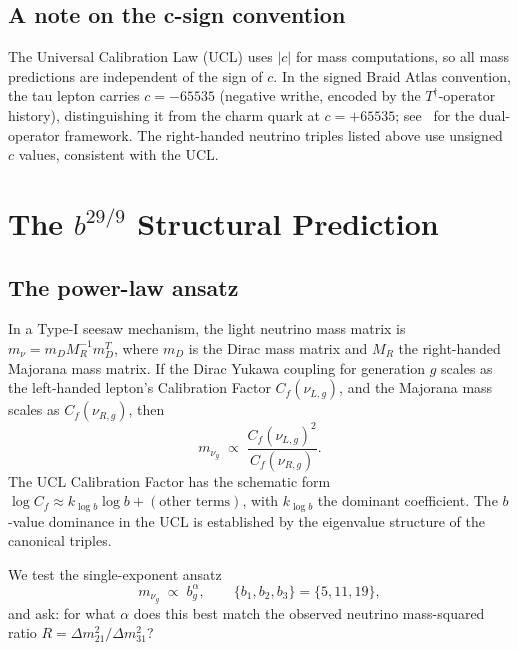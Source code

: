 \documentclass[12pt,a4paper]{article}
\theoremstyle{definition}
\theoremstyle{remark}
\begin{document}
\subsection{A note on the c-sign convention}
\label{subsec:csign}

The Universal Calibration Law (UCL) uses $|c|$ for mass computations,
so all mass predictions are independent of the sign of $c$.
In the signed Braid Atlas convention, the tau lepton carries
$c = -65535$ (negative writhe, encoded by the $T^\dagger$-operator history),
distinguishing it from the charm quark at $c = +65535$;
see~\cite{SpivackBraidAtlas} for the dual-operator framework.
The right-handed neutrino triples listed above use unsigned $c$ values,
consistent with the UCL.

\section{The $b^{29/9}$ Structural Prediction}
\label{sec:prediction}

\subsection{The power-law ansatz}
\label{subsec:ansatz}

In a Type-I seesaw mechanism, the light neutrino mass matrix is
$m_\nu = m_D M_R^{-1} m_D^T$,
where $m_D$ is the Dirac mass matrix and $M_R$ the right-handed
Majorana mass matrix.
If the Dirac Yukawa coupling for generation $g$ scales as the
left-handed lepton's Calibration Factor $C_f(\nu_{L,g})$, and
the Majorana mass scales as $C_f(\nu_{R,g})$, then
\begin{equation}
  m_{\nu_g} \;\propto\; \frac{C_f(\nu_{L,g})^2}{C_f(\nu_{R,g})}.
  \label{eq:ucl_seesaw}
\end{equation}
The UCL Calibration Factor has the schematic form
$\log C_f \approx k_{\log b} \log b + (\text{other terms})$,
with $k_{\log b}$ the dominant coefficient.
The $b$-value dominance in the UCL
is established by the eigenvalue structure of the canonical triples.

We test the single-exponent ansatz
\begin{equation}
  m_{\nu_g} \;\propto\; b_g^{\alpha}, \qquad \{b_1, b_2, b_3\} = \{5, 11, 19\},
  \label{eq:ansatz}
\end{equation}
and ask: for what $\alpha$ does this best match the observed
neutrino mass-squared ratio $R = \Delta m^2_{21}/\Delta m^2_{31}$?
\end{document}
